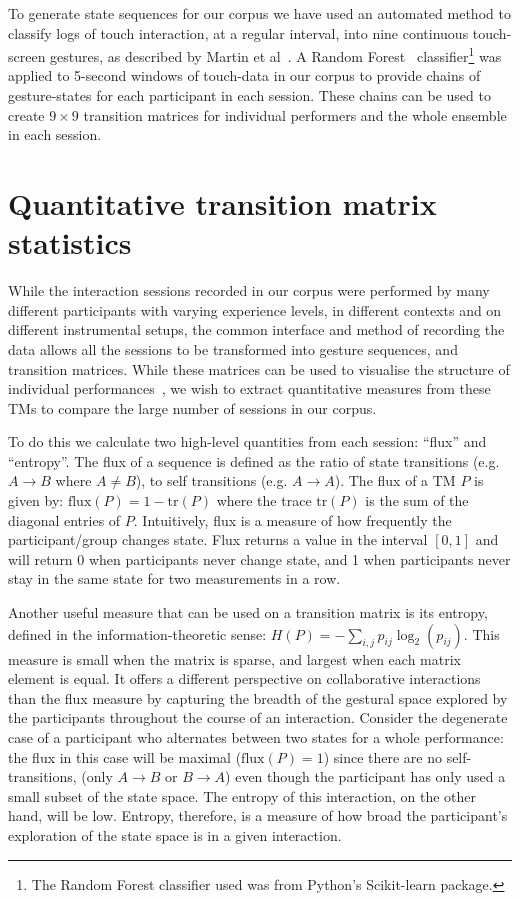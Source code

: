 \documentclass{sigchi}
\begin{document}
To generate state sequences for our corpus we have used an automated
method to classify logs of touch interaction, at a regular interval,
into nine continuous touch-screen gestures, as described by Martin et
al~\cite{Martin:2015jk}. A Random Forest~\cite{Breiman:2001kx}
classifier\footnote{The Random Forest classifier used was from
  Python's Scikit-learn package\cite{scikit-learn}.} was applied to
5-second windows of touch-data in our corpus to provide chains of
gesture-states for each participant in each session. These chains can
be used to create $9 \times 9$ transition matrices for individual
performers and the whole ensemble in each session.

\section{Quantitative transition matrix statistics}
\label{sec:underst-impr-group}

While the interaction sessions recorded in our corpus were performed
by many different participants with varying experience levels, in
different contexts and on different instrumental setups, the common
interface and method of recording the data allows all the sessions to
be transformed into gesture sequences, and transition matrices. While
these matrices can be used to visualise the structure of individual
performances~\cite{Swift:2014tya}, we wish to extract quantitative
measures from these TMs to compare the large number of sessions in our
corpus.

To do this we calculate two high-level quantities from each session:
``flux'' and ``entropy''. The flux of a sequence is defined as the
ratio of state transitions (e.g. $A \rightarrow B$ where $A \neq B$),
to self transitions (e.g. $A \rightarrow A $). The flux of a TM $P$ is
given by: $\mathrm{flux}(P) = 1 - \mathrm{tr}(P)$ where the trace
$\mathrm{tr}(P)$ is the sum of the diagonal entries of $P$.
Intuitively, flux is a measure of how frequently the participant/group
changes state. Flux returns a value in the interval $[0,1]$ and will
return 0 when participants never change state, and 1 when participants
never stay in the same state for two measurements in a row.

Another useful measure that can be used on a transition matrix is its
entropy, defined in the information-theoretic\cite{Shannon:1948rt}
sense: $H(P) = -\sum_{i,j}p_{ij}\log_2(p_{ij})$. This measure
is small when the matrix is sparse, and largest when each matrix
element is equal. It offers a different perspective on collaborative
interactions than the flux measure by capturing the breadth of the
gestural space explored by the participants throughout the course of
an interaction. Consider the degenerate case of a participant who
alternates between two states for a whole performance: the flux in
this case will be maximal ($\mathrm{flux}(P) = 1$) since there are no
self-transitions, (only $A \rightarrow B$ or $ B \rightarrow A$) even
though the participant has only used a small subset of the state
space. The entropy of this interaction, on the other hand, will be
low. Entropy, therefore, is a measure of how broad the participant's
exploration of the state space is in a given interaction.
\end{document}
